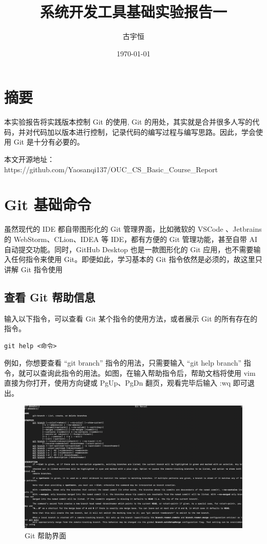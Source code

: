 \documentclass[UTF8]{gyh}
\title{系统开发工具基础实验报告一}
\author{古宇恒}
\date{\today}
\begin{document}
    \fancyfoot[C]{\thepage}

    \maketitle
    \tableofcontents
    \newpage

    \section{摘要}
    本实验报告将实践版本控制 Git 的使用, Git 的用处，其实就是合并很多人写的代码，并对代码加以版本进行控制，记录代码的编写过程与编写思路。因此，学会使用 Git 是十分有必要的。

    本文开源地址：https://github.com/Yaosanqi137/OUC\_CS\_Basic\_Course\_Report

    \section{Git 基础命令}

    虽然现代的 IDE 都自带图形化的 Git 管理界面，比如微软的 VSCode 、Jetbrains 的 WebStorm、CLion、IDEA 等 IDE，都有方便的 Git 管理功能，甚至自带 AI 自动提交功能。同时，GitHub Desktop 也是一款图形化的 Git 应用，也不需要输入任何指令来使用 Git。即便如此，学习基本的 Git 指令依然是必须的，故这里只讲解 Git 指令使用

    \subsection{查看 Git 帮助信息}
    输入以下指令，可以查看 Git 某个指令的使用方法，或者展示 Git 的所有存在的指令。
    \begin{lstlisting}
git help <命令>
    \end{lstlisting}
    例如，你想要查看 “git branch” 指令的用法，只需要输入 “git help branch” 指令，就可以查询此指令的用法。如图，在输入帮助指令后，帮助文档将使用 vim 直接为你打开，使用方向键或 PgUp、PgDn 翻页，观看完毕后输入 :wq 即可退出。
    \begin{figure}[H]
        \centering
        \includegraphics[scale=0.18]{img/img1}
        \caption{Git 帮助界面}
    \end{figure}
\end{document}
